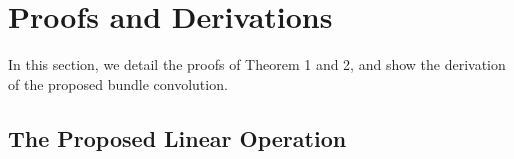 \vspace{-0.1in}
\section{Proofs and Derivations}

In this section, we detail the proofs of Theorem 1 and 2, and show the derivation of the proposed bundle convolution.

\vspace{-0.03in}
\subsection{The Proposed Linear Operation}
